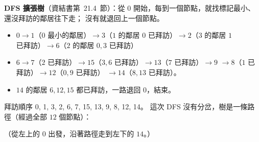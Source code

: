 \begin{pastsoln}
\textbf{DFS 擴張樹}（資結書第~21.4~節）：從 $0$ 開始，每到一個節點，就找標記最小、還沒拜訪的鄰居往下走；
沒有就退回上一個節點。
\begin{itemize}
\item $0 \to 1$（$0$ 最小的鄰居）$\to 3$（$1$ 的鄰居 $0$ 已拜訪）$\to 2$（$3$ 的鄰居 $1$ 已拜訪）$\to 6$（$2$ 的鄰居 $0, 3$ 已拜訪）
\item $6 \to 7$（$2$ 已拜訪）$\to 15$（$3, 6$ 已拜訪）$\to 13$（$7$ 已拜訪）$\to 9$ $\to 8$（$1$ 已拜訪）$\to 12$（$0, 9$ 已拜訪）
$\to 14$（$8, 13$ 已拜訪）。
\item $14$ 的鄰居 $6, 12, 15$ 都已拜訪，一路退回 $0$，結束。
\end{itemize}
拜訪順序 0, 1, 3, 2, 6, 7, 15, 13, 9, 8, 12, 14。 這次 DFS 沒有分岔，樹是一條路徑（經過全部 $12$ 個節點）：
\begin{center}
\end{center}
（從左上的 $0$ 出發，沿著路徑走到左下的 $14$。）
\end{pastsoln}
